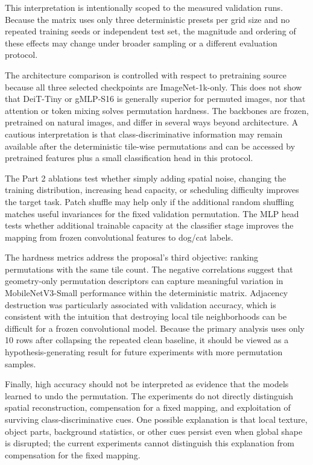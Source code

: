 \documentclass[12pt]{article}
\begin{document}
This interpretation is intentionally scoped to the measured validation runs. Because the matrix uses only three deterministic presets per grid size and no repeated training seeds or independent test set, the magnitude and ordering of these effects may change under broader sampling or a different evaluation protocol.

The architecture comparison is controlled with respect to pretraining source because all three selected checkpoints are ImageNet-1k-only. This does not show that DeiT-Tiny or gMLP-S16 is generally superior for permuted images, nor that attention or token mixing solves permutation hardness. The backbones are frozen, pretrained on natural images, and differ in several ways beyond architecture. A cautious interpretation is that class-discriminative information may remain available after the deterministic tile-wise permutations and can be accessed by pretrained features plus a small classification head in this protocol.

The Part 2 ablations test whether simply adding spatial noise, changing the training distribution, increasing head capacity, or scheduling difficulty improves the target task. Patch shuffle may help only if the additional random shuffling matches useful invariances for the fixed validation permutation. The MLP head tests whether additional trainable capacity at the classifier stage improves the mapping from frozen convolutional features to dog/cat labels.

The hardness metrics address the proposal's third objective: ranking permutations with the same tile count. The negative correlations suggest that geometry-only permutation descriptors can capture meaningful variation in MobileNetV3-Small performance within the deterministic matrix. Adjacency destruction was particularly associated with validation accuracy, which is consistent with the intuition that destroying local tile neighborhoods can be difficult for a frozen convolutional model. Because the primary analysis uses only 10 rows after collapsing the repeated clean baseline, it should be viewed as a hypothesis-generating result for future experiments with more permutation samples.

Finally, high accuracy should not be interpreted as evidence that the models learned to undo the permutation. The experiments do not directly distinguish spatial reconstruction, compensation for a fixed mapping, and exploitation of surviving class-discriminative cues. One possible explanation is that local texture, object parts, background statistics, or other cues persist even when global shape is disrupted; the current experiments cannot distinguish this explanation from compensation for the fixed mapping.
\end{document}
